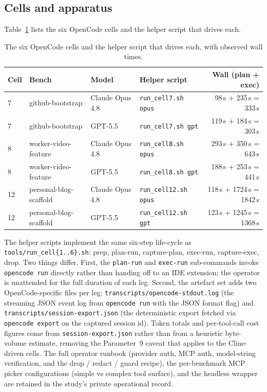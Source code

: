 \subsection{Cells and apparatus}

Table~\ref{tab:opencode-cells} lists the six OpenCode cells and the
helper script that drives each.

\begin{table}[h]
\centering
\caption{The six OpenCode cells and the helper script that drives
each, with observed wall times.}
\label{tab:opencode-cells}
\footnotesize
\begin{tabular}{@{}llllr@{}}
\toprule
Cell & Bench & Model & Helper script & Wall (plan + exec) \\
\midrule
7  & github-bootstrap       & Claude Opus 4.8   & \texttt{run\_cell7.sh opus}  & 98\,s + 235\,s = 333\,s \\
7  & github-bootstrap       & GPT-5.5  & \texttt{run\_cell7.sh gpt}   & 119\,s + 184\,s = 303\,s \\
8  & worker-video-feature   & Claude Opus 4.8   & \texttt{run\_cell8.sh opus}  & 293\,s + 350\,s = 643\,s \\
8  & worker-video-feature   & GPT-5.5  & \texttt{run\_cell8.sh gpt}   & 188\,s + 253\,s = 441\,s \\
12 & personal-blog-scaffold & Claude Opus 4.8   & \texttt{run\_cell12.sh opus} & 118\,s + 1724\,s = 1842\,s \\
12 & personal-blog-scaffold & GPT-5.5  & \texttt{run\_cell12.sh gpt}  & 123\,s + 1245\,s = 1368\,s \\
\bottomrule
\end{tabular}
\end{table}

The helper scripts implement the same six-step life-cycle as
\texttt{tools/run\_cell\{1..6\}.sh}: prep, plan-run, capture-plan,
exec-run, capture-exec, drop. Two things differ. First, the
\texttt{plan-run} and \texttt{exec-run} sub-commands invoke
\texttt{opencode run} directly rather than handing off to an IDE
extension; the operator is unattended for the full duration of each
leg. Second, the artefact set adds two OpenCode-specific files per
leg: \texttt{transcripts/opencode-stdout.log} (the streaming JSON
event log from \texttt{opencode run} with the JSON format flag) and
\texttt{transcripts/session-export.json} (the deterministic export
fetched via \texttt{opencode export} on the captured session id).
Token totals and per-tool-call cost figures come from
\texttt{session-export.json} rather than from a heuristic byte-volume
estimate, removing the Parameter~9 caveat that applies to the
Cline-driven cells. The full operator runbook (provider auth, MCP
auth, model-string verification, and the drop / redact / guard recipe),
the per-benchmark MCP picker configurations (simple vs complex tool
surface), and the headless wrapper are retained in the study's private
operational record.

